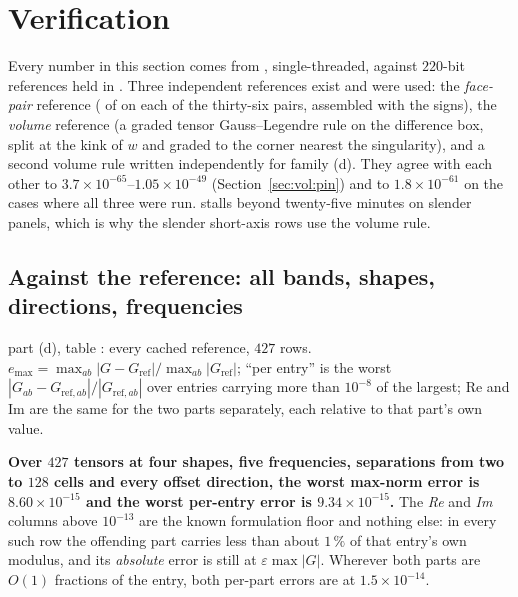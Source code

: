 \section{Verification}
\label{sec:ver}

Every number in this section comes from , single-threaded,
against $220$-bit references held in . Three independent
references exist and were used: the \emph{face-pair} reference ( of
 on each of the thirty-six pairs, assembled with the
 signs), the \emph{volume} reference (a graded  tensor
Gauss--Legendre rule on the difference box, split at the kink of $w$ and graded to the
corner nearest the singularity), and a second volume rule written independently for family
(d). They agree with each other to $3.7\times10^{-65}$--$1.05\times10^{-49}$
(Section~\ref{sec:vol:pin}) and to $1.8\times10^{-61}$ on the cases where all three were
run.  stalls beyond twenty-five minutes on slender panels, which is why the
slender short-axis rows use the volume rule.

\subsection{Against the reference: all bands, shapes, directions, frequencies}
\label{sec:ver:ref}

 part (d), table : every cached reference, $427$ rows.
$e_{\max} = \max_{ab}|G-G_{\mathrm{ref}}|/\max_{ab}|G_{\mathrm{ref}}|$; ``per entry'' is the
worst $|G_{ab}-G_{\mathrm{ref},ab}|/|G_{\mathrm{ref},ab}|$ over entries carrying more than
$10^{-8}$ of the largest; Re and Im are the same for the two parts separately, each relative
to that part's own value.

\begin{center}\footnotesize

\end{center}

\noindent
\textbf{Over $427$ tensors at four shapes, five frequencies, separations from two to $128$
cells and every offset direction, the worst max-norm error is $8.60\times10^{-15}$ and the
worst per-entry error is $9.34\times10^{-15}$.} The \emph{Re} and \emph{Im} columns above
$10^{-13}$ are the known formulation floor and nothing else: in every such row the offending
part carries less than about $1\,\%$ of that entry's own modulus, and its \emph{absolute}
error is still at $\varepsilon\max|G|$. Wherever both parts are $O(1)$ fractions of the
entry, both per-part errors are at $1.5\times10^{-14}$.

